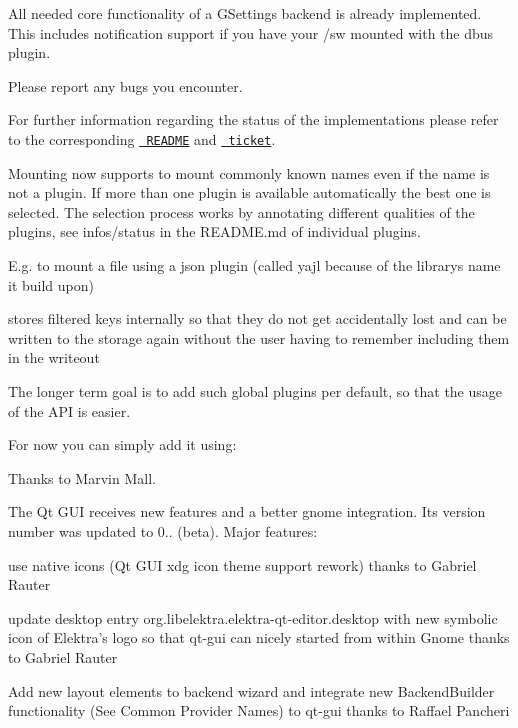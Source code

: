 All needed core functionality of a G\+Settings backend is already implemented. This includes notification support if you have your {\ttfamily /sw} mounted with the dbus plugin.

Please report any bugs you encounter.

For further information regarding the status of the implementations please refer to the corresponding \href{https://github.com/elektrainitiative/libelektra/tree/master/src/bindings/gsettings}{\texttt{ R\+E\+A\+D\+ME}} and \href{https://github.com/ElektraInitiative/libelektra/issues/775}{\texttt{ ticket}}.

Mounting now supports to mount commonly known names even if the name is not a plugin. If more than one plugin is available automatically the best one is selected. The selection process works by annotating different qualities of the plugins, see {\ttfamily infos/status} in the R\+E\+A\+D\+M\+E.\+md of individual plugins.

E.\+g. to mount a file using a json plugin (called yajl because of the library\textquotesingle{}s name it build upon)


\begin{DoxyCode}{0}
\end{DoxyCode}


stores filtered keys internally so that they do not get accidentally lost and can be written to the storage again without the user having to remember including them in the writeout

The longer term goal is to add such global plugins per default, so that the usage of the A\+PI is easier.

For now you can simply add it using\+:


\begin{DoxyCode}{0}
\end{DoxyCode}


Thanks to Marvin Mall.

The Qt G\+UI receives new features and a better gnome integration. Its version number was updated to 0.. (beta). Major features\+:


\begin{DoxyItemize}
\item use native icons (Qt G\+UI xdg icon theme support rework) thanks to Gabriel Rauter
\item update desktop entry org.\+libelektra.\+elektra-\/qt-\/editor.\+desktop with new symbolic icon of Elektra’s logo so that qt-\/gui can nicely started from within Gnome thanks to Gabriel Rauter
\item Add new layout elements to backend wizard and integrate new Backend\+Builder functionality (See Common Provider Names) to qt-\/gui thanks to Raffael Pancheri
\end{DoxyItemize}

